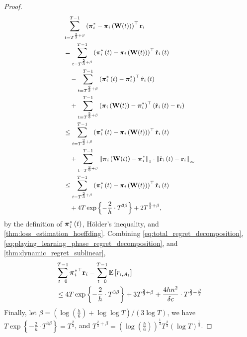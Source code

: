 \begin{proof}
\begin{equation}
\small
\label{eq:playing_learning_phase_regret_decomposition}
\begin{split}
    &\sum\limits_{t=T^{\frac{2}{3} + \beta}}^{T-1}{ \left( {\rvpi_i^*} - \rvpi_i\left( \rmW(t) \right) \right)^\top \rvr_i } \\
    &= \sum\limits_{t=T^{\frac{2}{3} + \beta}}^{T-1}{ \left( {\rvpi_i^*\left(t\right)} - \rvpi_i\left( \rmW(t) \right) \right)^\top \hat{\rvr}_i\left(t\right) } \\
    &\quad - \sum\limits_{t=T^{\frac{2}{3} + \beta}}^{T-1}{ \left( {\rvpi_i^*\left(t\right)} - {\rvpi_i^*} \right)^\top \hat{\rvr}_i\left(t\right) } \\
    &\quad + \sum\limits_{t=T^{\frac{2}{3} + \beta}}^{T-1}{  \left( \rvpi_i\left( \rmW(t) \right) - {\rvpi_i^*}\right)^\top \left(  \hat{\rvr}_i\left(t\right) - \rvr_i \right) } \\
    &\le \sum\limits_{t=T^{\frac{2}{3} + \beta}}^{T-1}{ \left( {\rvpi_i^*\left(t\right)} - \rvpi_i\left( \rmW(t) \right) \right)^\top \hat{\rvr}_i\left(t\right) } \\
    &\quad + \sum\limits_{t=T^{\frac{2}{3} + \beta}}^{T-1}{  \left\| \rvpi_i\left( \rmW(t) \right) - \rvpi_i^* \right\|_1 \cdot \left\| \hat{\rvr}_i\left(t\right) - \rvr_i \right\|_\infty } \\
    &\le \sum\limits_{t=T^{\frac{2}{3} + \beta}}^{T-1}{ \left( {\rvpi_i^*\left(t\right)} - \rvpi_i\left( \rmW(t) \right) \right)^\top \hat{\rvr}_i\left(t\right) } \\
    &\quad + 4 T \exp\left\{ - \frac{2}{h} \cdot  T^{3\beta} \right\} + 2 T^{\frac{2}{3} + \beta},
\end{split}
\end{equation}
by the definition of ${\boldsymbol{\pi}}_i^*\left(t\right)$, H{\"o}lder's inequality, and \cref{thm:loss_estimation_hoeffding}. 
Combining \cref{eq:total_regret_decomposition}, \cref{eq:playing_learning_phase_regret_decomposition}, and \cref{thm:dynamic_regret_sublinear},
\begin{equation*}
\begin{split}
    &\sum\limits_{t=0}^{T-1}{ {{\boldsymbol{\pi}}_i^*}^\top {\mathbf{r}}_i } - \sum\limits_{t=0}^{T-1}{ {\mathbb{E}} \left[ r_{i, A_t} \right] } \\
    &\le  4 T \exp\left\{ - \frac{2}{h} \cdot  T^{3\beta} \right\} + 3 T^{\frac{2}{3} + \beta} + \frac{4 h n^2}{\delta c} \cdot T^{\frac{2}{3} - \frac{\beta}{2}}
\end{split}
\end{equation*}
Finally, let $\beta = \left( \log{\left(\frac{h}{6}\right) + \log{\log{T}} } \right)/\left(3 \log{T}\right)$, we have $T \exp\left\{ - \frac{2}{h} \cdot  T^{3\beta} \right\} = T^{\frac{2}{3}}$, and $T^{\frac{2}{3} + \beta} = \left( \log{\left(\frac{h}{6}\right)}\right)^{\frac{1}{3}} T^{\frac{2}{3}} \left(\log{T}\right)^{\frac{1}{3}}$.
\end{proof}

